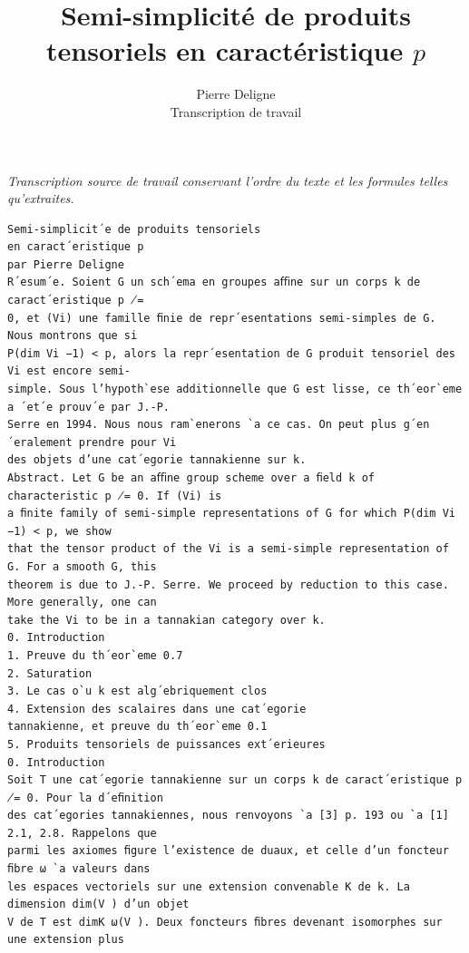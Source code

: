 \documentclass[10pt]{article}
\begin{document}
\title{Semi-simplicit\'e de produits tensoriels en caract\'eristique $p$}
\author{Pierre Deligne\\Transcription de travail}
\date{}
\maketitle
\noindent\textit{Transcription source de travail conservant l'ordre du texte et les formules telles qu'extraites.}
\small
\begin{verbatim}
Semi-simplicit´e de produits tensoriels
en caract´eristique p
par Pierre Deligne
R´esum´e. Soient G un sch´ema en groupes aﬃne sur un corps k de caract´eristique p ̸=
0, et (Vi) une famille ﬁnie de repr´esentations semi-simples de G.
Nous montrons que si
P(dim Vi −1) < p, alors la repr´esentation de G produit tensoriel des Vi est encore semi-
simple. Sous l’hypoth`ese additionnelle que G est lisse, ce th´eor`eme a ´et´e prouv´e par J.-P.
Serre en 1994. Nous nous ram`enerons `a ce cas. On peut plus g´en´eralement prendre pour Vi
des objets d’une cat´egorie tannakienne sur k.
Abstract. Let G be an aﬃne group scheme over a ﬁeld k of characteristic p ̸= 0. If (Vi) is
a ﬁnite family of semi-simple representations of G for which P(dim Vi −1) < p, we show
that the tensor product of the Vi is a semi-simple representation of G. For a smooth G, this
theorem is due to J.-P. Serre. We proceed by reduction to this case. More generally, one can
take the Vi to be in a tannakian category over k.
0. Introduction
1. Preuve du th´eor`eme 0.7
2. Saturation
3. Le cas o`u k est alg´ebriquement clos
4. Extension des scalaires dans une cat´egorie
tannakienne, et preuve du th´eor`eme 0.1
5. Produits tensoriels de puissances ext´erieures
0. Introduction
Soit T une cat´egorie tannakienne sur un corps k de caract´eristique p ̸= 0. Pour la d´eﬁnition
des cat´egories tannakiennes, nous renvoyons `a [3] p. 193 ou `a [1] 2.1, 2.8. Rappelons que
parmi les axiomes ﬁgure l’existence de duaux, et celle d’un foncteur ﬁbre ω `a valeurs dans
les espaces vectoriels sur une extension convenable K de k. La dimension dim(V ) d’un objet
V de T est dimK ω(V ). Deux foncteurs ﬁbres devenant isomorphes sur une extension plus


\end{verbatim}
\end{document}
